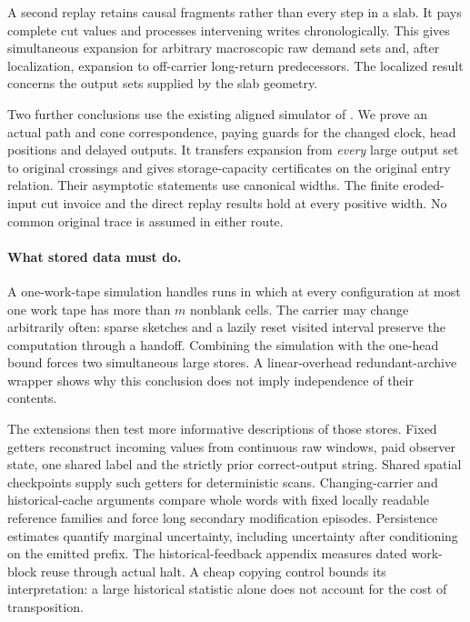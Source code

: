 A second replay retains causal fragments rather than every step in a slab.
It pays complete cut values and processes intervening writes chronologically.
This gives simultaneous expansion for arbitrary macroscopic raw demand sets
and, after localization, expansion to off-carrier long-return predecessors.
The localized result concerns the output sets supplied by the slab geometry.

Two further conclusions use the existing aligned simulator of
\cite{HighRateStorage2026}. We prove an actual path and cone correspondence,
paying guards for the changed clock, head positions and delayed outputs.
It transfers expansion from \emph{every} large output set to original
crossings and gives storage-capacity certificates on the original entry
relation. Their asymptotic statements use canonical widths. The finite
eroded-input cut invoice and the direct replay results hold at every
positive width. No common original trace is assumed in either route.

\paragraph{What stored data must do.}
A one-work-tape simulation handles runs in which at every configuration
at most one work tape has more than $m$ nonblank cells. The carrier may
change arbitrarily often: sparse sketches and a lazily reset visited
interval preserve the computation through a handoff. Combining the
simulation with the one-head bound forces two simultaneous large stores.
A linear-overhead redundant-archive wrapper shows why this conclusion
does not imply independence of their contents.

The extensions then test more informative descriptions of those stores.
Fixed getters reconstruct incoming values from continuous raw windows,
paid observer state, one shared label and the strictly prior correct-output
string. Shared spatial checkpoints supply such getters for deterministic
scans. Changing-carrier and historical-cache arguments compare whole words
with fixed locally readable reference families and force long secondary
modification episodes. Persistence estimates quantify marginal uncertainty,
including uncertainty after conditioning on the emitted prefix.
The historical-feedback appendix measures dated work-block reuse through
actual halt. A cheap copying control bounds its interpretation: a large
historical statistic alone does not account for the cost of transposition.

